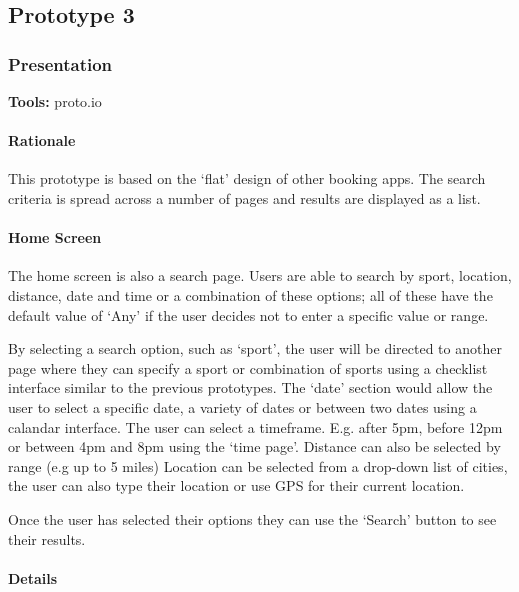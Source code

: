 \newpage
\subsection{Prototype 3}
\label{sub:prototype_3}

\subsubsection{Presentation}
\textbf{Tools:} proto.io

\paragraph{Rationale}

This prototype is based on the `flat' design of other booking apps. The search
criteria is spread across a number of pages and results are displayed as a
list.

\paragraph{Home Screen}

The home screen is also a search page. Users are able to search by sport,
location, distance, date and time or a combination of these options; all of
these have the default value of `Any' if the user decides not to enter a
specific value or range.

By selecting a search option, such as `sport', the user will be directed to
another page where they can specify a sport or combination of sports using a
checklist interface similar to the previous prototypes. The `date' section
would allow the user to select a specific date, a variety of dates or between
two dates using a calandar interface. The user can select a timeframe. E.g.
after 5pm, before 12pm or between 4pm and 8pm using the `time page'. Distance
can also be selected by range (e.g up to 5 miles) Location can be selected from
a drop-down list of cities, the user can also type their location or use GPS
for their current location.

Once the user has selected their options they can use the `Search' button to
see their results.

\paragraph{Details}

